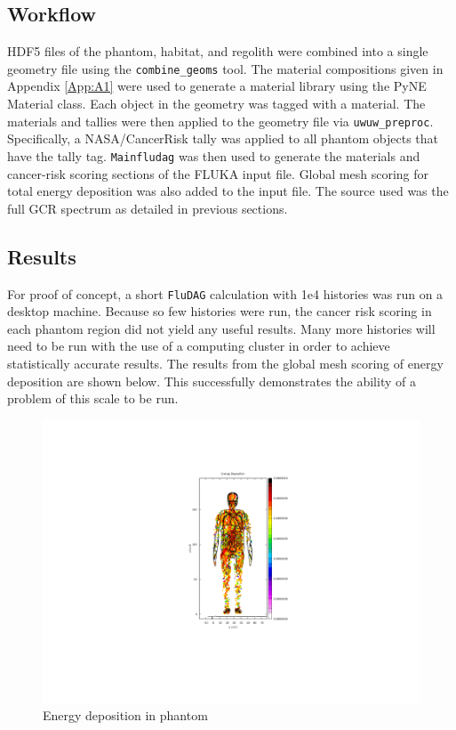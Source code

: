 \subsection*{Workflow}
HDF5 files of the phantom, habitat, and regolith were combined into a single geometry file
using the \texttt{combine\_geoms} tool.  The material compositions given in Appendix \ref{App:A1}
were used to generate a material library using the PyNE Material class.  Each object in
the geometry was tagged with a material.  The materials and tallies were then applied to the
geometry file via \texttt{uwuw\_preproc}.  Specifically, a NASA/CancerRisk tally was applied 
to all phantom objects that have the tally tag. \texttt{Mainfludag} was then used to generate the 
materials and cancer-risk scoring sections of the FLUKA input file.  Global mesh scoring 
for total energy deposition was also added to the input file.  The source used was the 
full GCR spectrum as detailed in previous sections.  


\subsection*{Results}

For proof of concept, a short \texttt{FluDAG}
calculation with 1e4 histories was run on a desktop machine.  Because so few histories 
were run, the cancer risk scoring in each phantom region did not yield any useful results.  
Many more histories will need to be run with the use of a computing cluster in order to 
achieve statistically accurate results.  The results from the global mesh scoring of 
energy deposition are shown below.  This successfully demonstrates the ability of a problem
of this scale to be run. 
 

\begin{figure}
 \begin{centering}
 \centering
 \includegraphics[width=\paperwidth]{../figs/phantom_ed.png}
 \caption{Energy deposition in phantom}
 \end{centering}
\end{figure}
